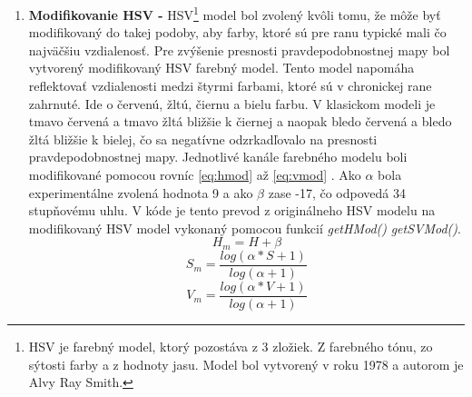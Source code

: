 \begin{enumerate}
    \item \textbf{Modifikovanie HSV -} HSV\footnote{HSV je farebný model, ktorý pozostáva z 3 zložiek. Z farebného tónu, zo sýtosti farby a z hodnoty jasu. Model bol vytvorený v roku 1978 a autorom je Alvy Ray Smith.\cite{uF1voTq6ULHlwdRU}} model bol zvolený kvôli tomu, že môže byť modifikovaný do takej podoby, aby farby, ktoré sú pre ranu typické mali čo najväčšiu vzdialenosť. Pre zvýšenie presnosti pravdepodobnostnej mapy bol vytvorený modifikovaný HSV farebný model. Tento model napomáha reflektovať vzdialenosti medzi štyrmi farbami, ktoré sú v chronickej rane zahrnuté. Ide o červenú, žltú, čiernu a bielu farbu. V klasickom modeli je tmavo červená a tmavo žltá bližšie k čiernej a naopak bledo červená a bledo žltá bližšie k bielej, čo sa negatívne odzrkadľovalo na presnosti pravdepodobnostnej mapy. Jednotlivé kanále farebného modelu boli modifikované pomocou rovníc \ref{eq:hmod} až \ref{eq:vmod} \cite{AHMADFAUZI201574}. Ako $\alpha$ bola experimentálne zvolená hodnota 9 a ako $\beta$ zase -17, čo odpovedá 34 stupňovému uhlu. V kóde je tento prevod z originálneho HSV modelu na modifikovaný HSV model vykonaný pomocou funkcií \textit{getHMod()} \textit{getSVMod()}.
    \begin{equation}
    \label{eq:hmod}
    H_{m} = H + \beta
    \end{equation}
    \begin{equation}
    \label{eq:smod}
    S_{m} = \frac{log(\alpha * S + 1)}{log(\alpha + 1)}
    \end{equation}
    \begin{equation}
    \label{eq:vmod}
    V_{m} = \frac{log(\alpha * V + 1)}{log(\alpha + 1)}
    \end{equation}
    

\end{enumerate}
